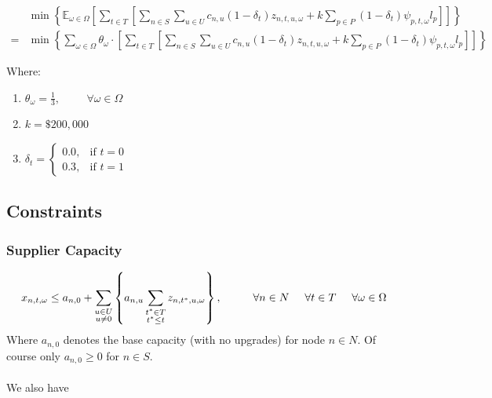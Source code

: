 \documentclass{article}
\newcommand{\E}{\ensuremath{\mathbb{E}}}
\begin{document}
\begin{align}
    &\min{\left\{\E_{\omega\in \Omega}\left[\sum_{t\in T}\left[\sum_{n\in S}\sum_{u \in U}c_{n,u}  (1 - \delta_{t}) z_{n,t,u,\omega} + k \sum_{p \in P}(1 - \delta_{t})\psi_{p,t,\omega} l_p\right]\right]\right\}} \\
    =& \min{\left\{\sum_{\omega \in \Omega} \theta_\omega \cdot\left[\sum_{t\in T}\left[\sum_{n\in S}\sum_{u \in U}c_{n,u}  (1 - \delta_{t}) z_{n,t,u,\omega} + k \sum_{p \in P}(1 - \delta_{t})\psi_{p,t,\omega} l_p\right]\right] \right\}} 
\end{align}

\bigskip
Where:
\begin{enumerate}
    \item \(\theta_\omega = \frac{1}{3}, \hspace{1cm} \forall \omega \in \Omega\)
    \item \(k = \$ 200,000\)
    \item \(\delta_t = \begin{cases}
    0.0, & \text{if } t = 0 \\
    0.3, & \text{if } t = 1
    \end{cases}\)
\end{enumerate}
\newpage
\subsection{Constraints}

\noindent
\subsubsection{Supplier Capacity}
\[x_{n,t,\omega}\leq a_{n,0} + \sum_{\substack{u \in U \\ u \neq 0}}\left\{a_{n,u} \sum_{\substack{t^*\in T \\ t^* \leq t}}z_{n,t^*,u,\omega}\right\}, \hspace{1cm} \forall n\in N \hspace{0.5cm} \forall t \in T \hspace{0.5cm} \forall \omega \in \Omega\]
\smallskip\noindent
Where \(a_{n,0}\) denotes the base capacity (with no upgrades) for node \(n \in N\). Of course only \(a_{n,0} \geq 0\) for \(n \in S\).\\
\\
We also have
\end{document}
